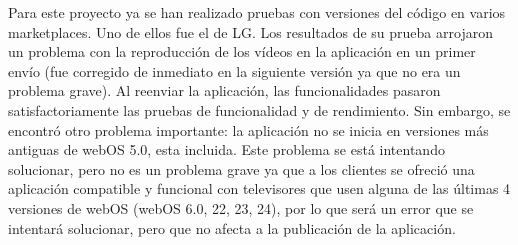 Para este proyecto ya se han realizado pruebas con versiones del código en varios marketplaces. Uno de ellos fue el de LG. Los 
resultados de su prueba arrojaron un problema con la reproducción de los vídeos en la aplicación en un primer envío (fue corregido de 
inmediato en la siguiente versión ya que no era un problema grave). Al reenviar la aplicación, las funcionalidades pasaron satisfactoriamente
las pruebas de funcionalidad y de rendimiento. Sin embargo, se encontró otro problema importante: la aplicación no se inicia en 
versiones más antiguas de webOS 5.0, esta incluida. Este problema se está intentando solucionar, pero no es un problema grave ya que
a los clientes se ofreció una aplicación compatible y funcional con televisores que usen alguna de las últimas 4 versiones de webOS
(webOS 6.0, 22, 23, 24), por lo que será un error que se intentará solucionar, pero que no afecta a la publicación de la aplicación.
